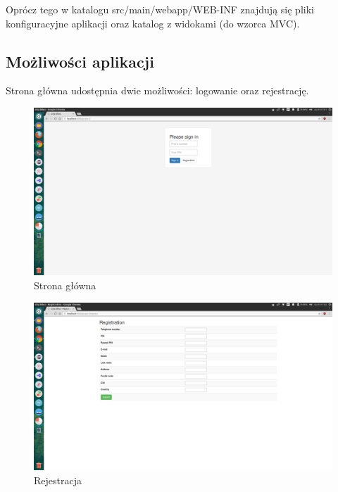 \documentclass{article}
\begin{document}
Oprócz tego w katalogu src/main/webapp/WEB-INF znajdują się pliki konfiguracyjne aplikacji oraz katalog z widokami (do wzorca MVC).

\subsection{Możliwości aplikacji}
Strona główna udostępnia dwie możliwości: logowanie oraz rejestrację.
\begin{figure}[p]
\centerline{
	\includegraphics[width=\paperwidth, height=\paperheight, keepaspectratio]{screenshots/loginscreen.png}}
	\caption{Strona główna}
\end{figure}
\begin{figure}[p]
\centerline{
	\includegraphics[width=\paperwidth, height=\paperheight, keepaspectratio]{screenshots/registration.png}}
	\caption{Rejestracja}
\end{figure}
\end{document}
